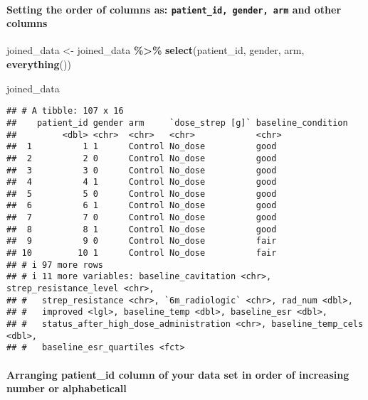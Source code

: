 \documentclass[
]{article}
\newenvironment{Shaded}{\begin{snugshade}}{\end{snugshade}}
\newcommand{\FunctionTok}[1]{\textcolor[rgb]{0.13,0.29,0.53}{\textbf{#1}}}
\newcommand{\NormalTok}[1]{#1}
\newcommand{\OtherTok}[1]{\textcolor[rgb]{0.56,0.35,0.01}{#1}}
\newcommand{\SpecialCharTok}[1]{\textcolor[rgb]{0.81,0.36,0.00}{\textbf{#1}}}
\begin{document}
\paragraph{\texorpdfstring{Setting the order of columns as:
\texttt{patient\_id,\ gender,\ arm} and other
columns}{Setting the order of columns as: patient\_id, gender, arm and other columns}}\label{setting-the-order-of-columns-as-patient_id-gender-arm-and-other-columns}

\begin{Shaded}
\begin{Highlighting}[]
\NormalTok{joined\_data }\OtherTok{\textless{}{-}}\NormalTok{ joined\_data }\SpecialCharTok{\%\textgreater{}\%} \FunctionTok{select}\NormalTok{(patient\_id, gender, arm, }\FunctionTok{everything}\NormalTok{())}

\NormalTok{joined\_data}
\end{Highlighting}
\end{Shaded}

\begin{verbatim}
## # A tibble: 107 x 16
##    patient_id gender arm     `dose_strep [g]` baseline_condition
##         <dbl> <chr>  <chr>   <chr>            <chr>             
##  1          1 1      Control No_dose          good              
##  2          2 0      Control No_dose          good              
##  3          3 0      Control No_dose          good              
##  4          4 1      Control No_dose          good              
##  5          5 0      Control No_dose          good              
##  6          6 1      Control No_dose          good              
##  7          7 0      Control No_dose          good              
##  8          8 1      Control No_dose          good              
##  9          9 0      Control No_dose          fair              
## 10         10 1      Control No_dose          fair              
## # i 97 more rows
## # i 11 more variables: baseline_cavitation <chr>, strep_resistance_level <chr>,
## #   strep_resistance <chr>, `6m_radiologic` <chr>, rad_num <dbl>,
## #   improved <lgl>, baseline_temp <dbl>, baseline_esr <dbl>,
## #   status_after_high_dose_administration <chr>, baseline_temp_cels <dbl>,
## #   baseline_esr_quartiles <fct>
\end{verbatim}

\paragraph{Arranging patient\_id column of your data set in order of
increasing number or
alphabeticall}\label{arranging-patient_id-column-of-your-data-set-in-order-of-increasing-number-or-alphabeticall}
\end{document}
